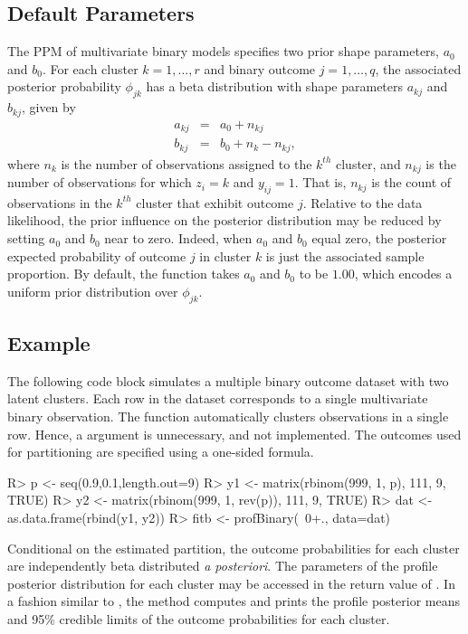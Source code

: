 \documentclass[article, nojss]{jss}
\begin{document}
\subsection[Defaults]{Default Parameters}
The PPM of multivariate binary models specifies two prior shape parameters, $a_0$ and $b_0$. For each cluster $k = 1, \ldots, r$ and binary outcome $j = 1, \ldots, q$, the associated posterior probability $\phi_{jk}$ has a beta distribution with shape parameters $a_{kj}$ and $b_{kj}$, given by
\begin{eqnarray}
a_{kj} &=& a_0 + n_{kj} \nonumber \\
b_{kj} &=& b_0 + n_k - n_{kj},
\end{eqnarray} 
where $n_k$ is the number of observations assigned to the $k^{th}$ cluster, and $n_{kj}$ is the number of observations for which $z_i = k$ and $y_{ij} = 1$. That is, $n_{kj}$ is the count of observations in the $k^{th}$ cluster that exhibit outcome $j$. Relative to the data likelihood, the prior influence on the posterior distribution may be reduced by setting $a_0$ and $b_0$ near to zero. Indeed, when $a_0$ and $b_0$ equal zero, the posterior expected probability of outcome $j$ in cluster $k$ is just the associated sample proportion. By default, the  function takes $a_0$ and $b_0$ to be $1.00$, which encodes a uniform prior distribution over $\phi_{jk}$.

\subsection[Example]{ Example}
The following  code block simulates a multiple binary outcome dataset with two latent clusters. Each row in the dataset corresponds to a single multivariate binary observation. The  function automatically clusters observations in a single row. Hence, a  argument is unnecessary, and not implemented. The outcomes used for partitioning are specified using a one-sided formula.
\begin{Schunk}
\begin{Sinput}
R> p <- seq(0.9,0.1,length.out=9)
R> y1 <- matrix(rbinom(999, 1, p), 111, 9, TRUE)
R> y2 <- matrix(rbinom(999, 1, rev(p)), 111, 9, TRUE)
R> dat <- as.data.frame(rbind(y1, y2))
R> fitb <- profBinary(~0+., data=dat)
\end{Sinput}
\end{Schunk}

Conditional on the estimated partition, the outcome probabilities for each cluster are independently beta distributed {\it a posteriori}. The parameters of the profile posterior distribution for each cluster may be accessed in the return value of . In a fashion similar to , the  method computes and prints the profile posterior means and 95\% credible limits of the outcome probabilities for each cluster.
\end{document}
